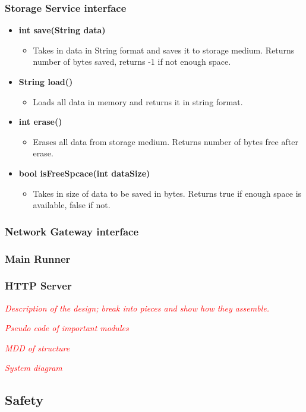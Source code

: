 \subsubsection{Storage Service interface}
\begin{itemize}
	\item \textbf{int save(String data)}
		\begin{itemize}
			\item Takes in data in String format and saves it to storage medium. 
			      Returns number of bytes saved, returns -1 if not enough space.
		\end{itemize}
	\item \textbf{String load()}
		\begin{itemize}
			\item Loads all data in memory and returns it in string format.
		\end{itemize}
	\item \textbf{int erase()}
		\begin{itemize}
			\item Erases all data from storage medium. Returns number of bytes
			      free after erase.
		\end{itemize}
	\item \textbf{bool isFreeSpcace(int dataSize)}
		\begin{itemize}
			\item Takes in size of data to be saved in bytes. Returns true if enough 
			      space is available, false if not.
		\end{itemize}
\end{itemize}


\subsubsection{Network Gateway interface}

\subsubsection{Main Runner}

\subsubsection{HTTP Server}

\textit{\textcolor{red}{Description of the design; break into pieces and show how 
						they assemble.}}

\textit{\textcolor{red}{Pseudo code of important modules}}

\textit{\textcolor{red}{MDD of structure}}

\textit{\textcolor{red}{System diagram}}

\subsection{Safety}
